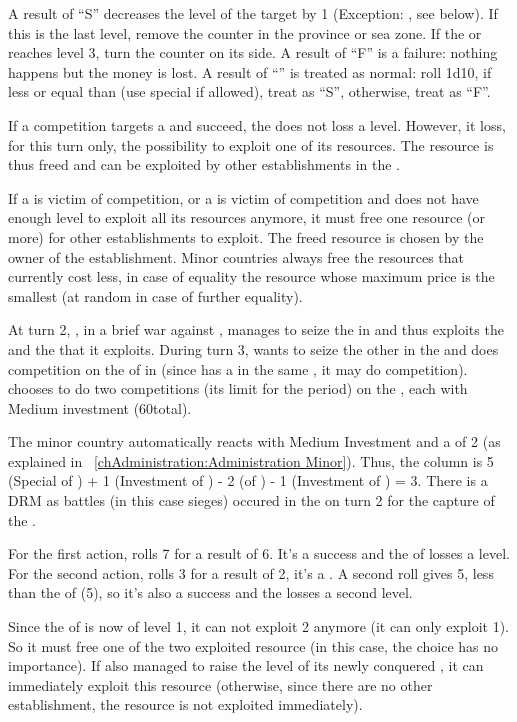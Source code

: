 \aparag[Results]
\bparag A result of ``S'' decreases the level of the target by 1 (Exception:
\COL, see below). If this is the last level, remove the counter in the
province or sea zone. If the \TradeFLEET or \TP reaches level 3, turn the
counter on its \Facemoins side.
\bparag A result of ``F'' is a failure: nothing happens but the money is lost.
\bparag A result of ``\undemi'' is treated as normal: roll 1d10, if less or
equal than \FTI (use special \FTI if allowed), treat as ``S'', otherwise,
treat as ``F''.

 If a competition targets a \COL and succeed, the
\COL does not loss a level.
\bparag However, it loss, for this turn only, the possibility to exploit one
of its resources.
\bparag The resource is thus freed and can be exploited by other
establishments in the \Area.

 If a \COL is victim of competition, or a \TP is
victim of competition and does not have enough level to exploit all its
resources anymore, it must free one resource (or more) for other
establishments to exploit.
\bparag The freed resource is chosen by the owner of the establishment. Minor
countries always free the resources that currently cost less, in case of
equality the resource whose maximum price is the smallest (at random in case
of further equality).

\begin{exemple}
  At turn 2, , in a brief war against \paysGujerat, manages to
  seize the \TP in  and thus exploits the  and
  the  that it exploits. During turn 3, \POR wants to seize the other
   in the \Area and does competition on the \TP of \paysGujerat in
  \provinceKolikot (since \POR has a \TP in the same \Area, it may do
  competition). \POR chooses to do two competitions (its limit for the period)
  on the \TP, each with Medium investment (60\ducats total).

  The minor country automatically reacts with Medium Investment and a \FTI of
  2 (as explained in ~\ref{chAdministration:Administration Minor}). Thus, the
  column is 5 (Special \FTI of \POR) + 1 (Investment of \POR) - 2 (\FTI of
  \paysGujerat) - 1 (Investment of \paysGujerat) = 3. There is a 
  DRM as battles (in this case sieges) occured in the \Area on turn 2 for the
  capture of the \TP.

  For the first action, \POR rolls 7 for a result of 6. It's a success and the
  \TP of \paysGujerat losses a level. For the second action, \POR rolls 3 for
  a result of 2, it's a \undemi. A second roll gives 5, less than the \FTI of
  \POR (5), so it's also a success and the \TP losses a second level.

  Since the \TP of \paysGujerat is now of level 1, it can not exploit 2
   anymore (it can only exploit 1). So it must free one of the two
  exploited resource (in this case, the choice has no importance). If \POR
  also managed to raise the level of its newly conquered \TP, it can
  immediately exploit this resource (otherwise, since there are no other
  establishment, the resource is not exploited immediately).
\end{exemple}


